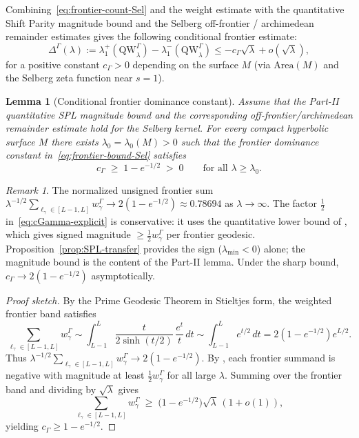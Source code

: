 \documentclass[12pt,a4paper]{article}
\newtheorem{lemma}[theorem]{Lemma}
\theoremstyle{definition}
\theoremstyle{remark}
\newtheorem{remark}[theorem]{Remark}
\newcommand{\QW}{\mathrm{QW}}
\begin{document}
Combining~\eqref{eq:frontier-count-Sel} and the weight estimate with the
quantitative Shift Parity magnitude bound and the Selberg off-frontier /
archimedean remainder estimates gives the following conditional frontier
estimate:
\begin{equation}
\label{eq:frontier-bound-Sel}
\Delta^\Gamma(\lambda) := \lambda_1^+(\QW^\Gamma_\lambda) - \lambda_1^-(\QW^\Gamma_\lambda)
\le -c_\Gamma\sqrt{\lambda} + o(\sqrt{\lambda}),
\end{equation}
for a positive constant $c_\Gamma > 0$ depending on the surface $M$ (via
$\mathrm{Area}(M)$ and the Selberg zeta function near $s=1$).

\begin{lemma}[Conditional frontier dominance constant]
\label{lem:frontier-constant}
Assume that the Part-II quantitative SPL magnitude bound and the corresponding
off-frontier/archimedean remainder estimate hold for the Selberg kernel. For
every compact hyperbolic surface $M$ there exists
$\lambda_0 = \lambda_0(M) > 0$ such that the frontier dominance constant in~\eqref{eq:frontier-bound-Sel} satisfies
\begin{equation}
\label{eq:cGamma-explicit}
c_\Gamma \;\ge\; 1-e^{-1/2} \;>\; 0
\qquad\text{for all }\lambda \ge \lambda_0.
\end{equation}
\end{lemma}

\begin{remark}
The normalized unsigned frontier sum $\lambda^{-1/2}\sum_{\ell_\gamma\in[L-1,L]}
w^\Gamma_\gamma \to 2(1-e^{-1/2}) \approx 0.78694$ as $\lambda\to\infty$.
The factor $\tfrac{1}{2}$ in~\eqref{eq:cGamma-explicit} is conservative: it uses
the quantitative lower bound of \cite[Lem.~A.3]{Geiger2026partII}, which gives
signed magnitude $\ge\tfrac{1}{2}w^\Gamma_\gamma$ per frontier geodesic.
Proposition~\ref{prop:SPL-transfer} provides the sign ($\lambda_{\min}<0$)
alone; the magnitude bound is the content of the Part-II lemma.
Under the sharp bound, $c_\Gamma \to 2(1-e^{-1/2})$ asymptotically.
\end{remark}

\begin{proof}[Proof sketch]
By the Prime Geodesic Theorem in Stieltjes form, the weighted frontier band
satisfies
\[
\sum_{\ell_\gamma\in[L-1,L]} w^\Gamma_\gamma
\sim
\int_{L-1}^{L} \frac{t}{2\sinh(t/2)}\,\frac{e^t}{t}\,dt
\sim
\int_{L-1}^{L} e^{t/2}\,dt
= 2(1-e^{-1/2})e^{L/2}.
\]
Thus $\lambda^{-1/2}\sum_{\ell_\gamma\in[L-1,L]} w^\Gamma_\gamma
\to 2(1-e^{-1/2})$. By \cite[Lem.~A.3]{Geiger2026partII},
each frontier summand is negative with magnitude at least
$\tfrac{1}{2}w^\Gamma_\gamma$ for all large $\lambda$.  Summing over the frontier
band and dividing by $\sqrt\lambda$ gives
\[
\sum_{\ell_\gamma\in[L-1,L]} w^\Gamma_\gamma \;\ge\;
\bigl(1-e^{-1/2}\bigr)\sqrt\lambda\,(1+o(1)),
\]
yielding $c_\Gamma \ge 1-e^{-1/2}$.
\end{proof}
\end{document}
